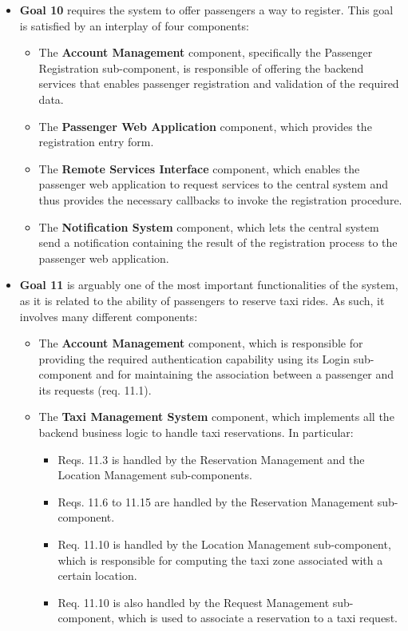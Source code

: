\begin{itemize}
\begin{itemize}
	\end{itemize}
	\item \textbf{Goal 10} requires the system to offer passengers a way to register. This goal is satisfied by an interplay of four components:
	\begin{itemize}
		\item The \textbf{Account Management} component, specifically the Passenger Registration sub-component, is responsible of offering the backend services that enables passenger registration and validation of the required data. 
		\item The \textbf{Passenger Web Application} component, which provides the registration entry form.
		\item The \textbf{Remote Services Interface} component, which enables the passenger web application to request services to the central system and thus provides the necessary callbacks to invoke the registration procedure.
		\item The \textbf{Notification System} component, which lets the central system send a notification containing the result of the registration process to the passenger web application.
	\end{itemize}
	\item \textbf{Goal 11} is arguably one of the most important functionalities of the system, as it is related to the ability of passengers to reserve taxi rides. As such, it involves many different components:
	\begin{itemize}
		\item The \textbf{Account Management} component, which is responsible for providing the required authentication capability using its Login sub-component and for maintaining the association between a passenger and its requests (req. 11.1).
		\item The \textbf{Taxi Management System} component, which implements all the backend business logic to handle taxi reservations. In particular:
		\begin{itemize}
		\item Reqs. 11.3 is handled by the Reservation Management and the Location Management sub-components.
		\item Reqs. 11.6 to 11.15 are handled by the Reservation Management sub-component.
		\item Req. 11.10 is handled by the Location Management sub-component, which is responsible for computing the taxi zone associated with a certain location.
		\item Req. 11.10 is also handled by the Request Management sub-component, which is used to associate a reservation to a taxi request. 

\end{itemize}
\end{itemize}
\end{itemize}
